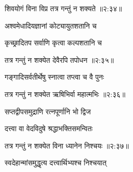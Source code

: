 
{\devanagarifont शिवयोगं विना विप्र तत्र गन्तुं न शक्यते {॥२:३४॥} \veg\dontdisplaylinenum }%

{\devanagarifont अश्वमेधादियज्ञानां कोट्यायुतशतानि च \thinspace{\dandab} \dontdisplaylinenum }%
 
{\devanagarifont कृच्छ्रादितप सर्वाणि कृत्वा कल्पशतानि च  \danda\dontdisplaylinenum }%


{\devanagarifont तत्र गन्तुं न शक्येत देवैरपि तपोधन {॥२:३५॥} \veg\dontdisplaylinenum }%

{\devanagarifont गङ्गादिसर्वतीर्थेषु स्नात्वा तप्त्वा च वै पुनः \thinspace{\dandab} \dontdisplaylinenum }%
 

{\devanagarifont तत्र गन्तुं न शक्येत ऋषिभिर्वा महात्मभिः {॥२:३६॥} \veg\dontdisplaylinenum }%

{\devanagarifont सप्तद्वीपसमुद्राणि रत्नपूर्णानि भो द्विज \thinspace{\dandab} \dontdisplaylinenum }%

{\devanagarifont दत्त्वा वा वेदविदुषे श्रद्धाभक्तिसमन्वितः  \danda\dontdisplaylinenum }%
 

{\devanagarifont तत्र गन्तुं न शक्येत विना ध्यानेन निश्चयः {॥२:३७॥} \veg\dontdisplaylinenum }%

{\devanagarifont स्वदेहान्मांसमुद्धृत्य दत्त्वार्थिभ्यश्च निश्चयात् \thinspace{\dandab} \dontdisplaylinenum }%

